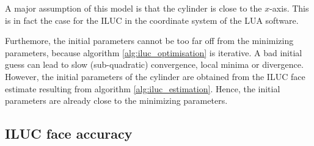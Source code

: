 A major assumption of this model is that the cylinder is close to the $x$-axis. This is in fact the case for the ILUC in the coordinate system of the LUA software. 

Furthemore, the initial parameters cannot be too far off from the minimizing parameters, because algorithm \ref{alg:iluc_optimisation} is iterative. A bad initial guess can lead to slow (sub-quadratic) convergence, local minima or divergence. However, the initial parameters of the cylinder are obtained from the ILUC face estimate resulting from algorithm \ref{alg:iluc_estimation}. Hence, the initial parameters are already close to the minimizing parameters.

\subsection{ILUC face accuracy}
